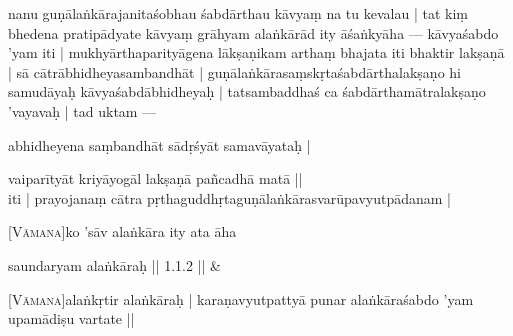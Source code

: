 \documentclass[14pt]{extarticle}
\begin{document}
\pstart
 nanu guṇālaṅkārajanitaśobhau śabdārthau kāvyaṃ na tu kevalau | tat kiṃ bhedena pratipādyate kāvyaṃ grāhyam alaṅkārād ity āśaṅkyāha — kāvyaśabdo ’yam iti | mukhyārthaparityāgena lākṣaṇikam arthaṃ bhajata iti bhaktir lakṣaṇā | sā cātrābhidheyasambandhāt | guṇālaṅkārasaṃskṛtaśabdārthalakṣaṇo hi samudāyaḥ kāvyaśabdābhidheyaḥ | tatsambaddhaś ca śabdārthamātralakṣaṇo ’vayavaḥ | tad uktam — 


    abhidheyena saṃbandhāt sādṛśyāt samavāyataḥ | 

\smallskip
vaiparītyāt kriyāyogāl lakṣaṇā pañcadhā matā || \\
iti | prayojanaṃ cātra pṛthaguddhṛtaguṇālaṅkārasvarūpavyutpādanam | 
\pend


\pstart
 \textsc{[Vāmana]}ko ’sāv alaṅkāra ity ata āha 
\pend


\stanza[\smallskip]

 \large saundaryam alaṅkāraḥ || 1.1.2 || \&



\pstart
 \textsc{[Vāmana]}alaṅkṛtir alaṅkāraḥ | karaṇavyutpattyā punar alaṅkāraśabdo ’yam upamādiṣu vartate || 
\pend



\endnumbering
\endgroup
\end{document}
